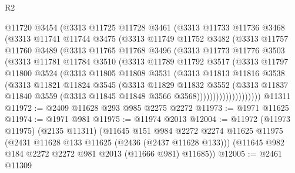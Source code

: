 \begin{lexlean}{R2}
\begin{coremodule}
            @11720
            @3454
            (@3313
              @11725
              @11728
              @3461
              (@3313
                @11733
                @11736
                @3468
                (@3313
                  @11741
                  @11744
                  @3475
                  (@3313
                    @11749
                    @11752
                    @3482
                    (@3313
                      @11757
                      @11760
                      @3489
                      (@3313
                        @11765
                        @11768
                        @3496
                        (@3313
                          @11773
                          @11776
                          @3503
                          (@3313
                            @11781
                            @11784
                            @3510
                            (@3313
                              @11789
                              @11792
                              @3517
                              (@3313
                                @11797
                                @11800
                                @3524
                                (@3313
                                  @11805
                                  @11808
                                  @3531
                                  (@3313
                                    @11813
                                    @11816
                                    @3538
                                    (@3313
                                      @11821
                                      @11824
                                      @3545
                                      (@3313
                                        @11829
                                        @11832
                                        @3552
                                        (@3313
                                          @11837
                                          @11840
                                          @3559
                                          (@3313 @11845 @11848 @3566 @3568))))))))))))))))))))
    @11311
@11972 := @2409 @11628 @293 @985 @2275 @2272
@11973 := @1971 @11625
@11974 := @1971 @981
@11975 := @11974 @2013
@12004 := @11972
    (@11973 @11975)
    (@2135 @11311)
    (@11645
      @151
      @984
      @2272
      @2274
      @11625
      @11975
      (@2431 @11628 @133 @11625 (@2436 (@2437 @11628 @133)))
      (@11645 @982 @184 @2272 @2272 @981 @2013 (@11666 @981) @11685))
@12005 := @2461 @11309

\end{coremodule}
\end{lexlean}
